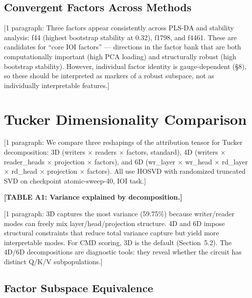 \documentclass[11pt]{article}
\begin{document}
\subsection{Convergent Factors Across Methods}

[1 paragraph: Three factors appear consistently across PLS-DA
and stability analysis: f44 (highest bootstrap stability at 0.32),
f1798, and f4461. These are candidates for ``core IOI factors'' ---
directions in the factor bank that are both computationally important
(high PCA loading) and structurally robust (high bootstrap stability).
However, individual factor identity is gauge-dependent (\S8), so these
should be interpreted as markers of a robust subspace, not as individually
interpretable features.]



\section{Tucker Dimensionality Comparison}
\label{app:tucker_dimensionality}

[1 paragraph: We compare three reshapings of the attribution tensor for
Tucker decomposition: 3D (writers $\times$ readers $\times$ factors,
standard), 4D (writers $\times$ reader\_heads $\times$ projection $\times$
factors), and 6D (wr\_layer $\times$ wr\_head $\times$ rd\_layer $\times$
rd\_head $\times$ projection $\times$ factors). All use HOSVD with
randomized truncated SVD on checkpoint atomic-sweep-40, IOI task.]

\textbf{[TABLE A1: Variance explained by decomposition.]}

[1 paragraph: 3D captures the most variance (59.75\%) because writer/reader
modes can freely mix layer/head/projection structure. 4D and 6D impose
structural constraints that reduce total variance capture but yield more
interpretable modes. For CMD scoring, 3D is the default (Section~5.2).
The 4D/6D decompositions are diagnostic tools: they reveal whether the
circuit has distinct Q/K/V subpopulations.]

\subsection{Factor Subspace Equivalence}
\end{document}
